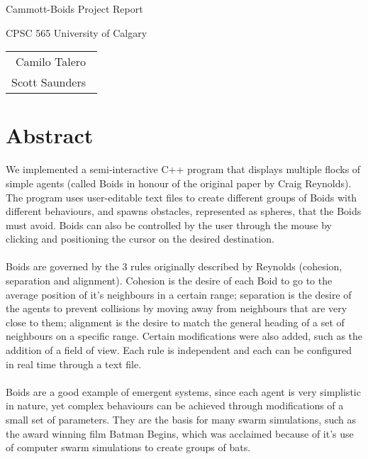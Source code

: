 \documentclass[12pt]{article}
\begin{document}
\thispagestyle{empty}
\begin{titlepage}
	\null\vfill
	
	\begin{center}
		
		{\Huge Cammott-Boids Project Report}
		\vskip 2cm
		
		{\large CPSC 565 University of Calgary}
	\end{center}
	
	\vfill
	\vfill
	
	\begin{tabular}{r}
		Camilo Talero\ \\
		Scott Saunders\    
	\end{tabular}
	\hfill
\end{titlepage}

	
\newpage
\clearpage
\setcounter{page}{1}

\section*{Abstract}

\indent We implemented a semi-interactive C++ program that displays multiple flocks of simple agents (called Boids in honour of the original paper by Craig Reynolds). The program uses user-editable text files to create different groups of Boids with different behaviours, and spawns obstacles, represented as spheres, that the Boids must avoid. Boids can also be controlled by the user through the mouse by clicking and positioning the cursor on the desired destination. 
\\ \\
Boids are governed by the 3 rules originally described by Reynolds (cohesion, separation and alignment). Cohesion is the desire of each Boid to go to the average position of it's neighbours in a certain range; separation is the desire of the agents to prevent collisions by moving away from neighbours that are very close to them; alignment is the desire to match the general heading of a set of neighbours on a specific range. Certain modifications were also added, such as the addition of a field of view. Each rule is independent and each can be configured in real time through a text file. 
\\ \\
Boids are a good example of emergent systems, since each agent is very simplistic in nature, yet complex behaviours can be achieved through modifications of a small set of parameters. They are the basis for many swarm simulations, such as the award winning film Batman Begins, which was acclaimed because of it's use of computer swarm simulations to create groups of bats.
\end{document}
